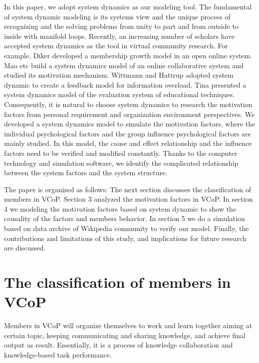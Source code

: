 \documentclass{elsarticle}
\begin{document}
In this paper, we adopt system dynamics as our modeling
tool. The fundamental of system dynamic modeling is its systems view
and the unique process of recognizing and the solving problems from
unity to part and from outside to inside with manifold
loops.  Recently, an increasing
number of scholars have accepted system dynamics as the tool in
virtual community research. For example, Diker  developed a
membership growth model in an open online system\cite{diker2004}. Mao etc build a system dynamics model of an online collaborative system and studied
its motivation mechanism\cite{4076734}. Wittmann and  Hattrup
adopted system dynamic to create a feedback model for information
overload\cite{wittmann_relationship_2004}. Tina presented a system dynamics model of
the evaluation system of educational techniques\cite{stavredes2001system}. Consequently, it is natural to choose system dynamics to
research the motivation factors from personal requirement and
organization environment perspectives. We developed a system dynamics
model to simulate the motivation factors, where the individual
psychological factors and the group influence psychological factors
are mainly studied. In this model, the cause and effect relationship
and the influence factors need to be verified and modified
constantly. Thanks to the computer technology and simulation software,
we identify the complicated relationship between the system factors
and the system structure. 
 
The paper is organized as follows: The next section discusses the
classification of members in VCoP. Section 3 analyzed the motivation factors
in VCoP. In section 4 we modeling the motivation factors based on system dynamic
to show the causality of the factors and members behavior. In section
5 we do a simulation based on data archive of Wikipedia community to verify our model.  Finally, the contributions and limitations of this study, and implications for future research are discussed.






\section{The classification of members in VCoP}
\label{sec:classification-uses}

Members in VCoP will organize themselves to work and learn together
aiming at certain topic, keeping  communicating and  sharing knowledge, and achieve final output as result. Essentially, it is a process of knowledge collaboration and knowledge-based task performance. 
\end{document}
